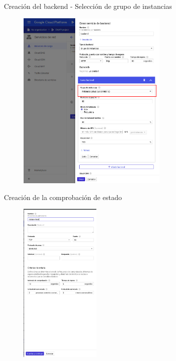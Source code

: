 \documentclass{beamer}
\begin{document}
\begin{frame}[fragile]{Creación del backend - Selección de grupo de instancias}
  \begin{figure}[H]
		\centering
		\includegraphics[width=0.65\textwidth]{project/backend_selection.png}
	\end{figure}
\end{frame}

\begin{frame}[fragile]{Creación de la comprobación de estado}
  \begin{figure}[H]
		\centering
		\includegraphics[width=0.35\textwidth]{project/status_check.png}
	\end{figure}
\end{frame}
\end{document}
